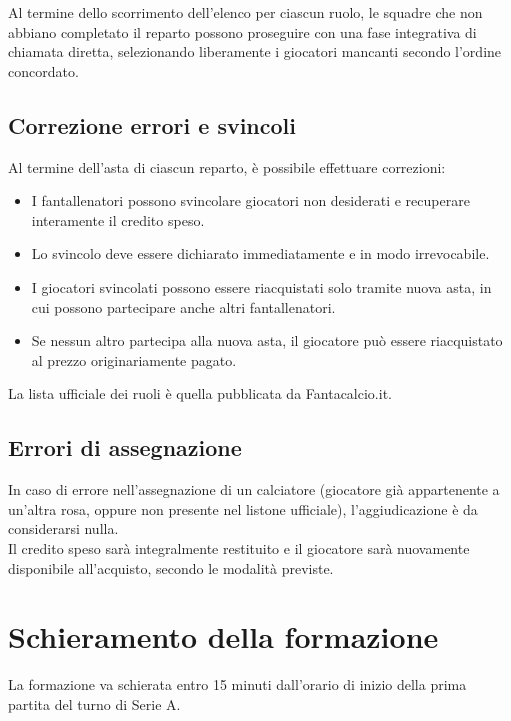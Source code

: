 Al termine dello scorrimento dell'elenco per ciascun ruolo, le squadre che non abbiano completato il reparto possono proseguire con una fase integrativa di chiamata diretta, selezionando liberamente i giocatori mancanti secondo l'ordine concordato.

\subsection{Correzione errori e svincoli}
\label{art:4.4.5}

Al termine dell'asta di ciascun reparto, è possibile effettuare correzioni:

\begin{itemize}
\item I fantallenatori possono svincolare giocatori non desiderati e recuperare interamente il credito speso.
\item Lo svincolo deve essere dichiarato immediatamente e in modo irrevocabile.
\item I giocatori svincolati possono essere riacquistati solo tramite nuova asta, in cui possono partecipare anche altri fantallenatori.
\item Se nessun altro partecipa alla nuova asta, il giocatore può essere riacquistato al prezzo originariamente pagato.
\end{itemize}

\noindent
La lista ufficiale dei ruoli è quella pubblicata da Fantacalcio.it.

\subsection{Errori di assegnazione}
\label{art:4.4.6}

In caso di errore nell'assegnazione di un calciatore (giocatore già appartenente a un'altra rosa, oppure non presente nel listone ufficiale), l'aggiudicazione è da considerarsi nulla.\\
Il credito speso sarà integralmente restituito e il giocatore sarà nuovamente disponibile all'acquisto, secondo le modalità previste.

\section{Schieramento della formazione}
\label{art:4.5}

La formazione va schierata entro 15 minuti dall'orario di inizio della prima partita del turno di Serie A.\\

